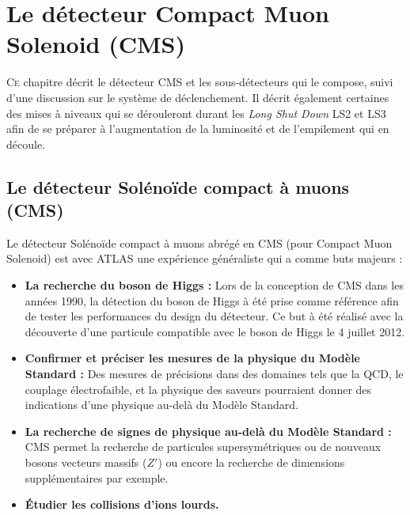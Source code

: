 \chapter{Le détecteur Compact Muon Solenoid (CMS)}
\renewcommand\chapterillustration{CMS/cms.jpeg}
\ThisULCornerWallPaper{1}{\chapterillustration}
\minitoc

\lettrine[lines=4, slope=-0.5em]{C}{e} chapitre décrit le détecteur CMS et les sous-détecteurs qui le compose, suivi d'une discussion sur le système de déclenchement. Il décrit également certaines des mises à niveaux qui se dérouleront durant les \textit{Long Shut Down} LS2 et LS3 afin de se préparer à l'augmentation de la luminosité et de l'empilement qui en découle.

\section{Le détecteur Solénoïde compact à muons (CMS)}
Le détecteur Solénoïde compact à muons abrégé en CMS (pour Compact Muon Solenoid) est avec ATLAS une expérience généraliste qui a comme buts majeurs :

\begin{itemize}[label=$\bullet$]
	\item \textbf{La recherche du boson de Higgs : } Lors de la conception de CMS dans les années 1990, la détection du boson de Higgs à été prise comme référence afin de tester les performances du design du détecteur. Ce but à été réalisé avec la découverte d'une particule compatible avec le boson de Higgs le 4 juillet 2012.
	\item \textbf{Confirmer et préciser les mesures de la physique du Modèle Standard : } Des mesures de précisions dans des domaines tels que la QCD, le couplage électrofaible, et la physique des saveurs pourraient donner des indications d'une physique au-delà du Modèle Standard.
	\item \textbf{La recherche de signes de physique au-delà du Modèle Standard : }CMS permet la recherche de particules supersymétriques ou de nouveaux bosons vecteurs massifs ($Z'$) ou encore la recherche de dimensions supplémentaires par exemple.
	\item \textbf{Étudier les collisions d'ions lourds.}
\end{itemize}

